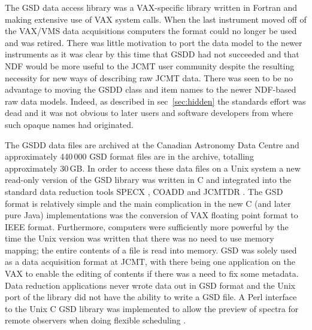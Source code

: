 \documentclass[final,authoryear,5p,times,twocolumn]{elsarticle}
\newcommand{\ascl}[1]{\href{http://www.ascl.net/#1}{ascl:#1}}
\begin{document}
The GSD data access library was a VAX-specific library
\citep{1986QJRAS..27..675.,mtdn84} written in Fortran and making
extensive use of VAX system calls. When the last instrument moved off
of the VAX/VMS data acquisitions computers the format could no longer
be used and was retired. There was little motivation to port the data
model to the newer instruments as it was clear by this time that GSDD
had not succeeded and that NDF would be more useful to the JCMT user
community despite the resulting necessity for new ways of describing raw JCMT
data. There was seen to be no advantage to moving the GSDD class and
item names to the newer NDF-based raw data models. Indeed, as
described in sec~\ref{sec:hidden} the standards effort was dead and it
was not obvious to later
users and software developers from where such opaque names had originated.

The GSDD data files are archived at the Canadian Astronomy Data
Centre and approximately 440\,000 GSD format files are in the
archive, totalling approximately 30\,GB. In order to access these data
files on a Unix system a new read-only version of the GSD library was
written in C \citep[][\ascl{1503.009}]{SUN229} and integrated into the standard data
reduction tools SPECX \citep[][\ascl{1310.008}]{SPECX,1990JCMTP...9...25P}, COADD
\citep[][\ascl{1411.020}]{COADD}  and JCMTDR
\citep[][\ascl{1406.019}]{SUN132}.  The GSD format is relatively
simple and the main complication in the new C (and later pure Java)
implementations was the conversion of VAX floating point format to
IEEE format. Furthermore, computers were sufficiently more powerful
by the time the Unix version was written that there was no need to use
memory mapping; the entire contents of a file is read into memory.
GSD was solely used as a data acquisition format at JCMT, with there
being one application on the VAX to enable the editing of contents if
there was a need to fix some metadata. Data reduction applications
never wrote data out in GSD format and the Unix port of the library
did not have the ability to write a GSD file.
A Perl interface to the Unix C GSD library \citep{1999ASPC..172..494J}
was implemented to allow the preview of spectra for remote observers
when doing flexible scheduling \citep{1997ASPC..125..401J}.
\end{document}
